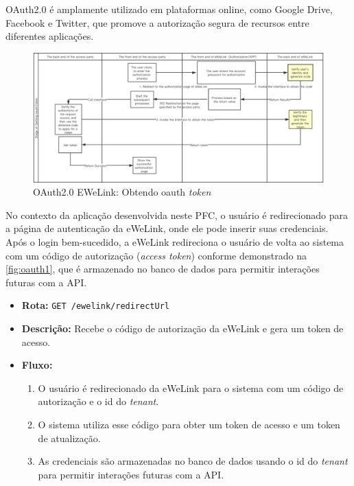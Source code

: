 OAuth2.0 é amplamente utilizado em plataformas online, como Google Drive, Facebook e Twitter, que promove a autorização segura de recursos entre diferentes aplicações.

\begin{figure}[htp]
	\caption{\label{fig:oauth1}OAuth2.0 EWeLink: Obtendo oauth \textit{token}}
	\begin{center}
	  \includegraphics[scale=0.45]{images/cap5/oauth_1.png}
	\end{center}
\end{figure}

No contexto da aplicação desenvolvida neste PFC, o usuário é redirecionado para a página de autenticação da eWeLink, onde ele pode inserir suas credenciais. Após o login bem-sucedido, a eWeLink redireciona o usuário de volta ao sistema com um código de autorização (\textit{access token}) conforme demonstrado na \autoref{fig:oauth1}, que é armazenado no banco de dados para permitir interações futuras com a API.

\begin{itemize}
    \item \textbf{Rota:} \texttt{GET /ewelink/redirectUrl}
    \item \textbf{Descrição:} Recebe o código de autorização da eWeLink e gera um token de acesso.
    \item \textbf{Fluxo:}
    \begin{enumerate}
        \item O usuário é redirecionado da eWeLink para o sistema com um código de autorização e o id do \textit{tenant}.
        \item O sistema utiliza esse código para obter um token de acesso e um token de atualização.
        \item As credenciais são armazenadas no banco de dados usando o id do \textit{tenant} para permitir interações futuras com a API.
    \end{enumerate}
\end{itemize}

